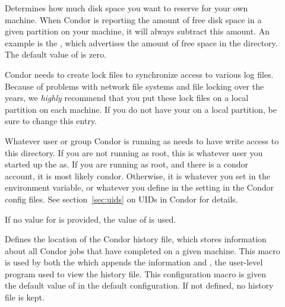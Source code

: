\begin{description}
\item[] \label{param:ReservedDisk} Determines
  how much disk space you want to reserve for your own machine.  When
  Condor is reporting the amount of free disk space in a given
  partition on your machine, it will always subtract this amount.  An
  example is the , which advertises the amount of free
  space in the  directory.  The default value of
   is zero.
  
\item[] \label{param:Lock} Condor needs to create
  lock files to synchronize access to various log files.  Because of
  problems with network file systems and file locking over
  the years, we \emph{highly} recommend that you put these lock
  files on a local partition on each machine.  If you do not have your
   on a local partition, be sure to change this
  entry.

  Whatever user or group Condor is running as needs to have
  write access to this directory.  If you are not running as root, this
  is whatever user you started up the  as.  If you are
  running as root, and there is a condor account, it is most
  likely condor.
  Otherwise, it is whatever you set in the 
  environment variable, or whatever you define in the
   setting in the Condor config files.
  See section~\ref{sec:uids} on UIDs in Condor for details.

  If no value for  is provided, the value of 
  is used.


\item[] \label{param:History} Defines the
  location of the Condor history file, which stores information about
  all Condor jobs that have completed on a given machine.  This macro
  is used by both the  which appends the information
  and , the user-level program used to view
  the history file.
  This configuration macro is given the default value of
   in the default configuration.
  If not defined,
  no history file is kept.


\end{description}
